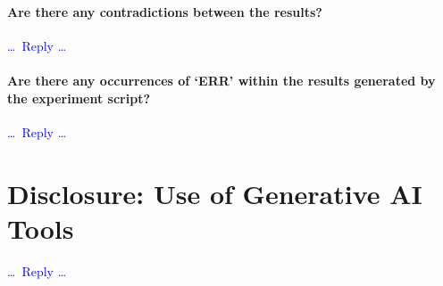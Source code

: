 \documentclass[a4paper,11pt,hidelinks]{article}
\renewcommand{\todo}[1]{\textcolor{blue}{#1}} %
\begin{document}
\paragraph{Are there any contradictions between the results?}
\todo{\dots\ Reply \dots}

\paragraph{Are there any occurrences of `ERR' within the results generated
  by the experiment script?}
\todo{\dots\ Reply \dots}



\bigskip
\section{Disclosure: Use of Generative AI Tools}


\todo{\dots\ Reply \dots}

\end{document}
